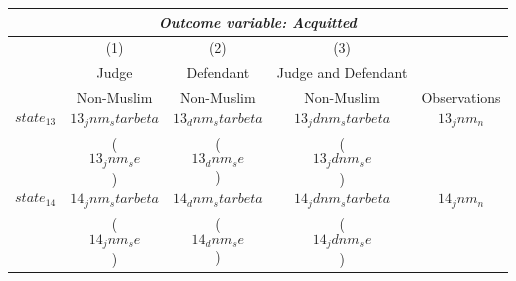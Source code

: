 {
\def\sym#1{\ifmmode^{#1}\else\(^{#1}\)\fi}
\begin{tabular}{l*{4}{c}}
  \hline\hline
\multicolumn{5}{c}{\textit{Outcome variable: Acquitted}}\\
\hline
&\multicolumn{1}{c}{(1)}&\multicolumn{1}{c}{(2)}&\multicolumn{1}{c}{(3)} &\multicolumn{1}{c}{}\\

\hspace{15mm}& Judge & Defendant & Judge and Defendant \\

\hspace{15mm} & Non-Muslim & Non-Muslim & Non-Muslim & Observations \\
\hline 

$$state_13$$ \hspace{15mm} & $$13_jnm_starbeta$$ & $$13_dnm_starbeta$$ & $$13_jdnm_starbeta$$ & $$13_jnm_n$$ \\
                           & ($$13_jnm_se$$)     & ($$13_dnm_se$$)     & ($$13_jdnm_se$$)                    \\[2.5mm]
\hline

$$state_14$$ \hspace{15mm} & $$14_jnm_starbeta$$ & $$14_dnm_starbeta$$ & $$14_jdnm_starbeta$$ & $$14_jnm_n$$ \\
                           & ($$14_jnm_se$$)     & ($$14_dnm_se$$)     & ($$14_jdnm_se$$)                    \\[2.5mm]
\hline


\end{tabular}}
